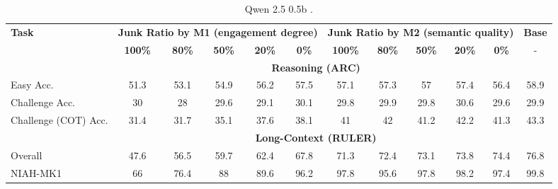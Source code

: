 \begin{table}[ht]
\centering
\scriptsize
\caption{Qwen 2.5 0.5b .}
\label{tab:tab:benchmark_qwen2.5_0.5b_full}
\setlength{\tabcolsep}{6pt}
\begin{tabular}{l|ccccc|ccccc|c}
\toprule
\multirow{2}{*}{\textbf{Task}}  & \multicolumn{5}{c|}{\textbf{Junk Ratio by M1 (engagement degree)}} & \multicolumn{5}{c|}{\textbf{Junk Ratio by M2 (semantic quality)}} & \textbf{Base} \\
 & \textbf{100\%} & \textbf{80\%} & \textbf{50\%} & \textbf{20\%} & \textbf{0\%} & \textbf{100\%} & \textbf{80\%} & \textbf{50\%} & \textbf{20\%} & \textbf{0\%} & - \\
\midrule
&\multicolumn{10}{c}{\textbf{Reasoning (ARC)}}\\
Easy Acc. & \cellcolor{myred!90} 51.3 & \cellcolor{myred!69} 53.1 & \cellcolor{myred!47} 54.9 & \cellcolor{myred!32} 56.2 & \cellcolor{myred!16} 57.5 & \cellcolor{myred!21} 57.1 & \cellcolor{myred!19} 57.3 & \cellcolor{myred!22} 57 & \cellcolor{myred!18} 57.4 & \cellcolor{myred!29} 56.4 & 58.9 \\
Challenge Acc. & \cellcolor{royalblue!4} 30 & \cellcolor{myred!90} 28 & \cellcolor{myred!16} 29.6 & \cellcolor{myred!39} 29.1 & \cellcolor{royalblue!7} 30.1 & \cellcolor{myred!8} 29.8 & \cellcolor{myred!4} 29.9 & \cellcolor{myred!8} 29.8 & \cellcolor{royalblue!27} 30.6 & \cellcolor{myred!16} 29.6 & 29.9 \\
Challenge (COT) Acc. & \cellcolor{myred!90} 31.4 & \cellcolor{myred!87} 31.7 & \cellcolor{myred!62} 35.1 & \cellcolor{myred!43} 37.6 & \cellcolor{myred!39} 38.1 & \cellcolor{myred!17} 41 & \cellcolor{myred!10} 42 & \cellcolor{myred!16} 41.2 & \cellcolor{myred!8} 42.2 & \cellcolor{myred!15} 41.3 & 43.3 \\
\midrule
&\multicolumn{10}{c}{\textbf{Long-Context (RULER)}}\\
Overall & \cellcolor{myred!90} 47.6 & \cellcolor{myred!63} 56.5 & \cellcolor{myred!53} 59.7 & \cellcolor{myred!44} 62.4 & \cellcolor{myred!28} 67.8 & \cellcolor{myred!17} 71.3 & \cellcolor{myred!13} 72.4 & \cellcolor{myred!11} 73.1 & \cellcolor{myred!9} 73.8 & \cellcolor{myred!7} 74.4 & 76.8 \\
NIAH-MK1 & \cellcolor{myred!90} 66 & \cellcolor{myred!62} 76.4 & \cellcolor{myred!31} 88 & \cellcolor{myred!27} 89.6 & \cellcolor{myred!10} 96.2 & \cellcolor{myred!5} 97.8 & \cellcolor{myred!11} 95.6 & \cellcolor{myred!5} 97.8 & \cellcolor{myred!4} 98.2 & \cellcolor{myred!6} 97.4 & 99.8 \\

\end{tabular}
\end{table}
